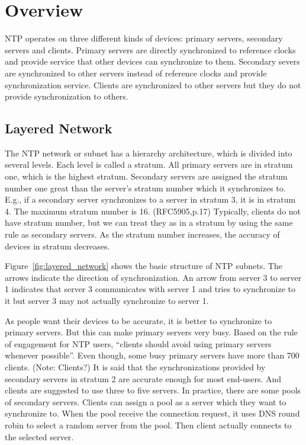 
\chapter{Overview}
NTP operates on three different kinds of devices: primary servers, secondary
servers and clients. Primary servers are directly synchronized to reference
clocks and provide service that other devices can synchronize to them.
Secondary severs are synchronized to other servers instead of reference clocks
and provide synchronization service. Clients are synchronized to other servers
but they do not provide synchronization to others.

\section{Layered Network}
\label{sec:Layered_network}
The NTP network or subnet has a hierarchy architecture, which is divided into
several levels. Each level is called a stratum. All primary servers are in
stratum one, which is the highest stratum. Secondary servers are assigned the
stratum number one great than the server's stratum number which it synchronizes
to. E.g., if a secondary server synchronizes to a server in stratum 3, it is in
stratum 4. The maximum stratum number is 16. (RFC5905,p.17)
Typically, clients do not have stratum number, but we can treat they
as in a stratum by using the same rule as secondary servers.
As the stratum number increases, the accuracy of devices in stratum
decreases.

Figure~\ref{fig:layered_network} shows the basic structure of NTP subnets. The
arrows indicate the direction of synchronization. An arrow from server 3 to
server 1 indicates that server 3 communicates with server 1 and tries to
synchronize to it but server 3 may not actually synchronize to server 1.



As people want their devices to be accurate, it is better to synchronize to
primary servers. But this can make primary servers very busy. Based on the rule
of engagement for NTP users, ``clients should avoid using primary servers
whenever possible''. Even though, some busy primary servers have more than 700
clients. (Note: Clients?)
It is said that the synchronizations provided by secondary servers in stratum 2
are accurate enough for most end-users. And clients are suggested to use three
to five servers. In practice, there are some pools of secondary servers.
Clients can assign a pool as a server which they want to synchronize to. When
the pool receive the connection request, it uses DNS round robin to select a
random server from the pool. Then client actually connects to the selected
server.

